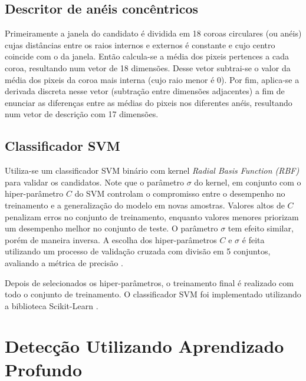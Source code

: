     \subsection{Descritor de anéis concêntricos}
       Primeiramente a janela do candidato é dividida em 18 coroas circulares (ou anéis) cujas distâncias entre os raios internos e externos é constante e cujo centro coincide com o da janela. Então calcula-se a média dos pixeis pertences a cada coroa, resultando num vetor de 18 dimensões. Desse vetor subtrai-se o valor da média dos pixeis da coroa mais interna (cujo raio menor é 0). Por fim, aplica-se a derivada discreta nesse vetor (subtração entre dimensões adjacentes) a fim de enunciar as diferenças entre as médias do pixeis nos diferentes anéis, resultando num vetor de descrição com 17 dimensões.

    \subsection{Classificador SVM}
      Utiliza-se um classificador SVM binário com kernel \textit{Radial Basis Function (RBF)} \cite{rbfkernel} para validar os candidatos. Note que o parâmetro $\sigma$ do kernel, em conjunto com o hiper-parâmetro $C$ do SVM controlam o compromisso entre o desempenho no treinamento e a generalização do modelo em novas amostras. Valores altos de $C$ penalizam erros no conjunto de treinamento, enquanto valores menores priorizam um desempenho melhor no conjunto de teste. O parâmetro $\sigma$ tem efeito similar, porém de maneira inversa. A escolha dos hiper-parâmetros $C$ e $\sigma$ é feita utilizando um processo de validação cruzada com divisão em 5 conjuntos, avaliando a métrica de precisão \cite{evaluationMetrics}.

      Depois de selecionados os hiper-parâmetros, o treinamento final é realizado com todo o conjunto de treinamento. O classificador SVM foi implementado utilizando a biblioteca Scikit-Learn \cite{scikit-learn}.


\section{Detecção Utilizando Aprendizado Profundo}
\label{sec:deep}

